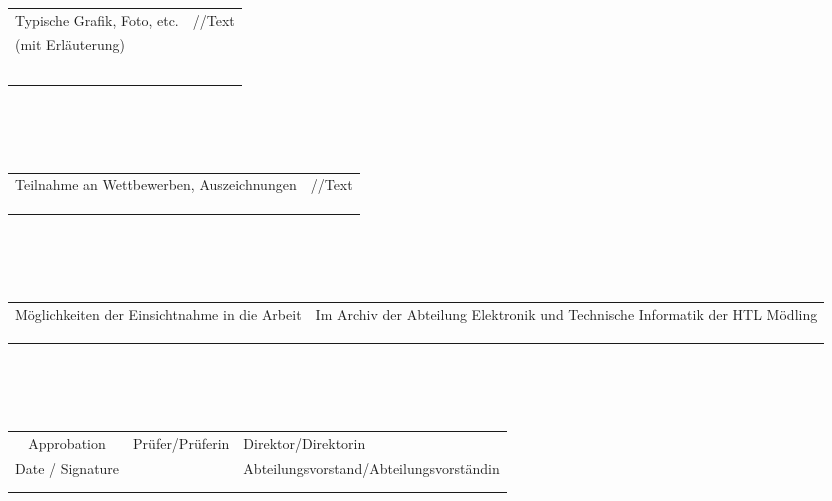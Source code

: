 \\
\\
\\
\noindent
\begin{tabularx}{\textwidth}{|m{}|X|}
	\hline
	Typische Grafik, Foto, etc. & //Text \\
	(mit Erläuterung)&\\
	&\\
	&\\
	&\\
	&\\
	&\\
	
	\hline
	
\end{tabularx}
\\
\\
\\
\noindent
\begin{tabularx}{\textwidth}{|m{}|X|}
	\hline
	Teilnahme an Wettbewerben, Auszeichnungen & //Text \\
	&\\
	&\\
	&\\

	
	\hline
	
\end{tabularx}
\\
\\
\\
\noindent
\begin{tabularx}{\textwidth}{|m{}|X|}
	\hline
  	Möglichkeiten der Einsichtnahme in die Arbeit & Im Archiv der Abteilung Elektronik und Technische  Informatik der HTL Mödling \\
	&\\
	&\\
	&\\
	
	
	\hline
	
\end{tabularx}
\\
\\
\\
\noindent
\begin{tabularx}{\textwidth}{|c|r|Y|}
	\hline
	Approbation & \footnotesize{Prüfer/Prüferin} & Direktor/Direktorin \\
	\small{Date / Signature} \normalsize&  & \footnotesize{Abteilungsvorstand/Abteilungsvorständin} \\
	&&\\
	&&\\
	
	
	\hline
	
\end{tabularx}

